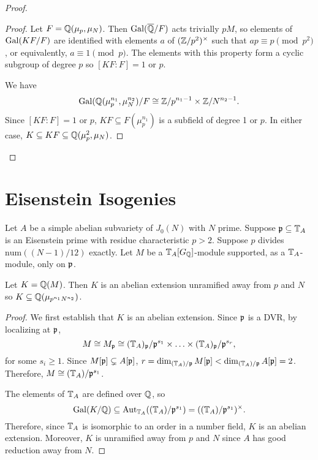 \documentclass[thesis.tex]{subfiles}
\begin{document}
\begin{proof}
\begin{proof}
        Let $F=\mathbb{Q}(\mu_p, \mu_N)$. Then $\operatorname{Gal}(\overline{\mathbb{Q}}/F)$ acts trivially $pM$,
        so elements of $\operatorname{Gal}(KF/F)$ are identified with elements $a$ of 
        $(\mathbb{Z}/p^2)^\times$ such that $ap\equiv p \pmod{p^2}$, or equivalently,
        $a\equiv 1 \pmod{p}$. The elements with this property form a cyclic
        subgroup of degree $p$ so $[KF:F]=1$ or $p$.

        We have 
        \[
            \operatorname{Gal}(\mathbb{Q}(\mu_p ^{n_1}, \mu_N ^{n_2})/F \cong \mathbb{Z}/p^{n_1-1} \times
            \mathbb{Z}/N^{n_2-1}.
        \]
        Since $[KF:F]=1$ or $p$, $KF\subseteq F(\mu_p ^{n_1})$ is a subfield of
        degree 1 or $p$. In either case, $K\subseteq KF \subseteq \mathbb{Q}(\mu_p ^2,
        \mu_N)$.
    \end{proof}
\end{proof}




\section{Eisenstein Isogenies}%
\label{sec:eisenstein_isogenies}


\begin{proposition}
    Let $A$ be a simple abelian subvariety of $J_0(N)$ with $N$ prime. Suppose
    $\mathfrak{p}\subseteq \mathbb{T}_A$ is an Eisenstein prime with residue characteristic
    $p>2$. Suppose $p$ divides $\mathrm{num}((N-1)/12)$ exactly. Let $M$ be a
    $\mathbb{T}_A[G_{\mathbb{Q}}]$-module supported, as a $\mathbb{T}_A$-module, only on $\mathfrak{p}$.
\end{proposition}

\begin{lemma}
    \label{lem:abelian_extension}
    Let $K=\mathbb{Q}(M)$. Then $K$ is an abelian extension unramified away from $p$
    and $N$ so $K\subseteq \mathbb{Q}(\mu_{p^{n_1}N^{n_2}})$.
\end{lemma}
\begin{proof}
    We first establish that $K$ is an abelian extension. Since $\mathfrak{p}$ is a DVR,
    by localizing at $\mathfrak{p}$,
    \[
        M \cong M_{\mathfrak{p}} \cong (\mathbb{T}_A)_{\mathfrak{p}}/\mathfrak{p}^{s_1}\times \ldots\times
        (\mathbb{T}_A)_{\mathfrak{p}}/\mathfrak{p}^{s_r},
    \]
    for some $s_i\geq 1$. Since $M[\mathfrak{p}]\subsetneq A[\mathfrak{p}]$, $r=\dim_{(\mathbb{T}_A)/\mathfrak{p}}
    M[\mathfrak{p}]<\dim_{(\mathbb{T}_A)/\mathfrak{p}} A[\mathfrak{p}]=2$. Therefore, $M\cong (\mathbb{T}_A)/\mathfrak{p}^{s_1}$.

    The elements of $\mathbb{T}_A$ are defined over $\mathbb{Q}$, so
    \[
        \operatorname{Gal}(K/\mathbb{Q}) \subseteq \operatorname{Aut}_{\mathbb{T}_A}((\mathbb{T}_A)/\mathfrak{p}^{s_1}) =
        ((\mathbb{T}_A)/\mathfrak{p}^{s_1})^\times.
    \]
    Therefore, since $\mathbb{T}_A$ is isomorphic to an order in a number field, $K$
    is an abelian extension. Moreover, $K$ is unramified away from $p$ and $N$
    since $A$ has good reduction away from $N$.
\end{proof}
\end{document}
